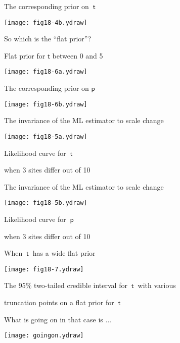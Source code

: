 \documentclass[bluish,slideColor,colorBG,pdf]{prosper}
\begin{document}
\begin{slide}[Replace]{The corresponding prior on $~\mathsf{t}$ }

\centerline{\texttt{[image: fig18-4b.ydraw]}}
\bigskip

So which is the ``flat prior''?

\end{slide}

\begin{slide}[Replace]{Flat prior for $\mathsf{t}$ between 0 and 5}

\centerline{\texttt{[image: fig18-6a.ydraw]}}

\end{slide}

\begin{slide}[Replace]{The corresponding prior on $\mathsf{p}$}

\centerline{\texttt{[image: fig18-6b.ydraw]}}

\end{slide}

\begin{slide}[Replace]{The invariance of the ML estimator to scale change}

\centerline{\texttt{[image: fig18-5a.ydraw]}}
\bigskip

\centerline{Likelihood curve for $\mathsf{~t~}$ }

\centerline{when 3 sites differ out of 10}

\end{slide}

\begin{slide}[Replace]{The invariance of the ML estimator to scale change}

\centerline{\texttt{[image: fig18-5b.ydraw]}}

\centerline{Likelihood curve for $\mathsf{~p~}$ }

\centerline{when 3 sites differ out of 10}

\end{slide}

\begin{slide}[Replace]{When $\mathsf{~t~}$ has a wide flat prior}

\centerline{\texttt{[image: fig18-7.ydraw]}}

\centerline{The 95\% two-tailed credible interval for $~\mathsf{t}~$ with various}
\centerline{truncation points on a flat prior for $~\mathsf{t}$}

\end{slide}

\begin{slide}[Replace]{What is going on in that case is ...}
\bigskip

\centerline{\texttt{[image: goingon.ydraw]}}

\end{slide}
\end{document}
